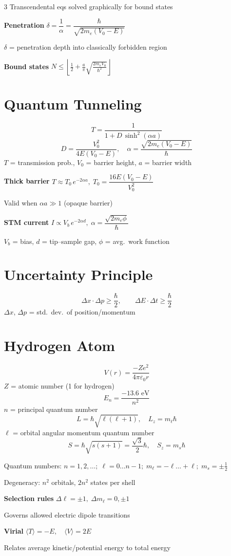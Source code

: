 \documentclass[9pt]{extarticle}
\newcommand{\eqlabel}[1]{\textbf{\scriptsize #1}\;}
\newcommand{\vardef}[1]{{\footnotesize\color{defgray}#1}}
\begin{document}
\begin{multicols}{3}
\vardef{Transcendental eqs solved graphically for bound states}

\eqlabel{Penetration} $\delta = \dfrac{1}{\alpha} = \dfrac{\hbar}{\sqrt{2m_e(V_0 - E)}}$

\vardef{$\delta$ = penetration depth into classically forbidden region}

\eqlabel{Bound states} $N \leq \left\lfloor \tfrac{1}{2} + \tfrac{a}{\pi}\sqrt{\tfrac{2m_eV_0}{\hbar^2}}\right\rfloor$

\section{Quantum Tunneling}
\[T = \frac{1}{1 + D\,\sinh^2(\alpha a)}\]
\[D = \frac{V_0^2}{4E(V_0-E)},\quad \alpha = \frac{\sqrt{2m_e(V_0-E)}}{\hbar}\]
\vardef{$T$ = transmission prob., $V_0$ = barrier height, $a$ = barrier width}

\eqlabel{Thick barrier} $T \approx T_0\,e^{-2\alpha a},\; T_0 = \dfrac{16E(V_0-E)}{V_0^2}$

\vardef{Valid when $\alpha a \gg 1$ (opaque barrier)}

\eqlabel{STM current} $I \propto V_b\,e^{-2\alpha d},\; \alpha = \dfrac{\sqrt{2m_e\phi}}{\hbar}$

\vardef{$V_b$ = bias, $d$ = tip--sample gap, $\phi$ = avg.\ work function}

\section{Uncertainty Principle}
\[\Delta x\cdot\Delta p \geq \frac{\hbar}{2},\qquad \Delta E\cdot\Delta t \geq \frac{\hbar}{2}\]
\vardef{$\Delta x$, $\Delta p$ = std.\ dev.\ of position/momentum}

\section{Hydrogen Atom}
\[V(r) = \frac{-Ze^2}{4\pi\varepsilon_0 r}\]
\vardef{$Z$ = atomic number (1 for hydrogen)}
\[E_n = \frac{-13.6\text{ eV}}{n^2}\]
\vardef{$n$ = principal quantum number}
\[L = \hbar\sqrt{\ell(\ell+1)},\quad L_z = m_\ell\hbar\]
\vardef{$\ell$ = orbital angular momentum quantum number}
\[S = \hbar\sqrt{s(s+1)} = \frac{\sqrt{3}}{2}\hbar,\quad S_z = m_s\hbar\]

Quantum numbers: $n=1,2,\ldots;\; \ell=0\ldots n\!-\!1;\; m_\ell=-\ell\ldots+\ell;\; m_s=\pm\tfrac{1}{2}$

Degeneracy: $n^2$ orbitals, $2n^2$ states per shell

\eqlabel{Selection rules} $\Delta\ell=\pm1,\;\Delta m_\ell=0,\pm1$

\vardef{Governs allowed electric dipole transitions}

\eqlabel{Virial} $\langle T \rangle = -E,\quad \langle V \rangle = 2E$

\vardef{Relates average kinetic/potential energy to total energy}

\end{multicols}
\newpage
\end{document}
